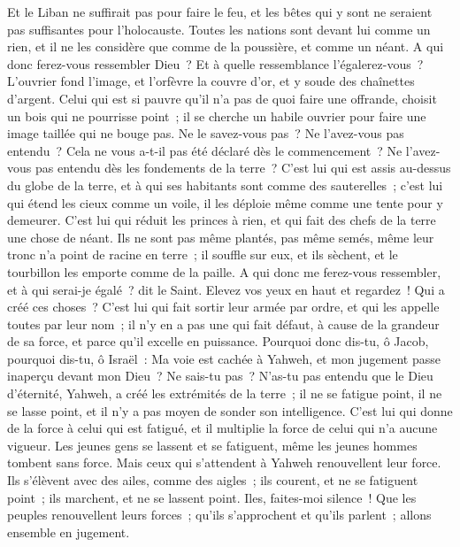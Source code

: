 \begin{multicols}{2}
Et le Liban ne suffirait pas pour faire le feu, et les bêtes qui y sont ne seraient pas suffisantes pour l'holocauste.
Toutes les nations sont devant lui comme un rien, et il ne les considère que comme de la poussière, et comme un néant.
A qui donc ferez-vous ressembler Dieu~? Et à quelle ressemblance l'égalerez-vous~?
L'ouvrier fond l'image, et l'orfèvre la couvre d'or, et y soude des chaînettes d'argent.
Celui qui est si pauvre qu'il n'a pas de quoi faire une offrande, choisit un bois qui ne pourrisse point~; il se cherche un habile ouvrier pour faire une image taillée qui ne bouge pas.
Ne le savez-vous pas~? Ne l'avez-vous pas entendu~? Cela ne vous a-t-il pas été déclaré dès le commencement~? Ne l'avez-vous pas entendu dès les fondements de la terre~?
C'est lui qui est assis au-dessus du globe de la terre, et à qui ses habitants sont comme des sauterelles~; c'est lui qui étend les cieux comme un voile, il les déploie même comme une tente pour y demeurer.
C'est lui qui réduit les princes à rien, et qui fait des chefs de la terre une chose de néant.
Ils ne sont pas même plantés, pas même semés, même leur tronc n'a point de racine en terre~; il souffle sur eux, et ils sèchent, et le tourbillon les emporte comme de la paille.
A qui donc me ferez-vous ressembler, et à qui serai-je égalé~? dit le Saint.
Elevez vos yeux en haut et regardez~! Qui a créé ces choses~? C'est lui qui fait sortir leur armée par ordre, et qui les appelle toutes par leur nom~; il n'y en a pas une qui fait défaut, à cause de la grandeur de sa force, et parce qu'il excelle en puissance.
Pourquoi donc dis-tu, ô Jacob, pourquoi dis-tu, ô Israël~: Ma voie est cachée à Yahweh, et mon jugement passe inaperçu devant mon Dieu~?
Ne sais-tu pas~? N'as-tu pas entendu que le Dieu d'éternité, Yahweh, a créé les extrémités de la terre~; il ne se fatigue point, il ne se lasse point, et il n'y a pas moyen de sonder son intelligence.
C'est lui qui donne de la force à celui qui est fatigué, et il multiplie la force de celui qui n'a aucune vigueur.
Les jeunes gens se lassent et se fatiguent, même les jeunes hommes tombent sans force.
Mais ceux qui s'attendent à Yahweh renouvellent leur force. Ils s'élèvent avec des ailes, comme des aigles~; ils courent, et ne se fatiguent point~; ils marchent, et ne se lassent point.
\VerseOne{}Iles, faites-moi silence~! Que les peuples renouvellent leurs forces~; qu'ils s'approchent et qu'ils parlent~; allons ensemble en jugement.

\end{multicols}
